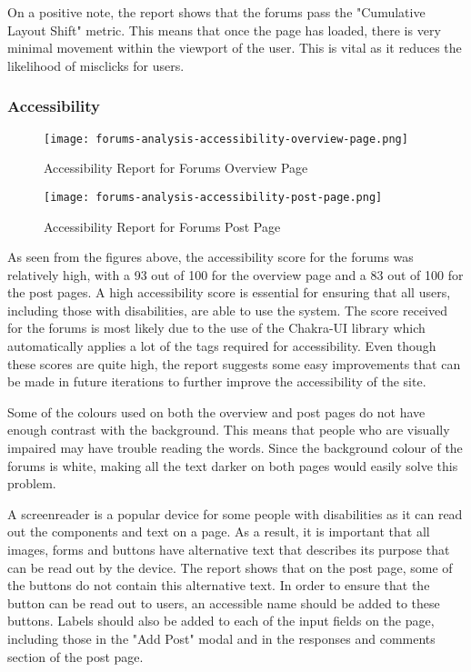 On a positive note, the report shows that the forums pass the "Cumulative Layout Shift" metric.
This means that once the page has loaded, there is very minimal movement within the viewport of the user.
This is vital as it reduces the likelihood of misclicks for users.

\subsubsection{Accessibility}

\begin{figure}[h!]
    \texttt{[image: forums-analysis-accessibility-overview-page.png]}
    \centering
    \caption{Accessibility Report for Forums Overview Page}
\end{figure}

\begin{figure}[h!]
    \texttt{[image: forums-analysis-accessibility-post-page.png]}
    \centering
    \caption{Accessibility Report for Forums Post Page}
\end{figure}

As seen from the figures above, the accessibility score for the forums was relatively high, with a 93 out of 100 for the overview page and a 83 out of 100 for the post pages.
A high accessibility score is essential for ensuring that all users, including those with disabilities, are able to use the system.
The score received for the forums is most likely due to the use of the Chakra-UI library which automatically applies a lot of the tags required for accessibility.
Even though these scores are quite high, the report suggests some easy improvements that can be made in future iterations to further improve the accessibility of the site.

Some of the colours used on both the overview and post pages do not have enough contrast with the background.
This means that people who are visually impaired may have trouble reading the words.
Since the background colour of the forums is white, making all the text darker on both pages would easily solve this problem.

A screenreader is a popular device for some people with disabilities as it can read out the components and text on a page.
As a result, it is important that all images, forms and buttons have alternative text that describes its purpose that can be read out by the device.
The report shows that on the post page, some of the buttons do not contain this alternative text.
In order to ensure that the button can be read out to users, an accessible name should be added to these buttons.
Labels should also be added to each of the input fields on the page, including those in the "Add Post" modal and in the responses and comments section of the post page.

